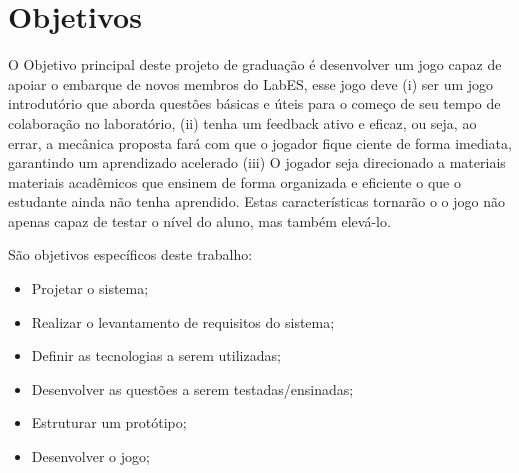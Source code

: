 \section{Objetivos}
\label{sec-intro-obj}




O Objetivo principal deste projeto de graduação é desenvolver um jogo capaz de apoiar o embarque de novos membros do LabES, esse jogo deve  (i) ser um jogo introdutório que aborda questões básicas e úteis para o começo de seu tempo de colaboração no laboratório, (ii) tenha um feedback ativo e eficaz, ou seja, ao errar, a mecânica proposta fará com que o jogador fique ciente de forma imediata, garantindo um aprendizado acelerado (iii) O jogador seja direcionado a materiais materiais acadêmicos que ensinem de forma organizada e eficiente o que o estudante ainda não tenha aprendido. Estas características tornarão o o jogo não apenas capaz de testar o nível do aluno, mas também elevá-lo.

    São objetivos específicos deste trabalho:
\begin{itemize}
    \item Projetar o sistema;
    \item Realizar o levantamento de requisitos do sistema;
    \item Definir as tecnologias a serem utilizadas;
    \item Desenvolver as questões a serem testadas/ensinadas;
    \item Estruturar um protótipo;
    \item Desenvolver o jogo;
\end{itemize}



